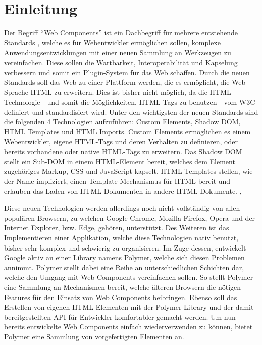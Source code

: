 \chapter{Einleitung}\label{einleitung}

Der Begriff ``Web Components'' ist ein Dachbegriff für mehrere entstehende Standards \cite{citeulike:13844988}, welche es für Webentwickler ermöglichen sollen, komplexe Anwendungsentwicklungen mit einer neuen Sammlung an Werkzeugen zu vereinfachen. Diese sollen die Wartbarkeit, Interoperabilität und Kapselung verbessern und somit ein Plugin-System für das Web schaffen. Durch die neuen Standards soll das Web zu einer Plattform werden, die es ermöglicht, die Web-Sprache \ac{HTML} zu erweitern. Dies ist bisher nicht möglich, da die \ac{HTML}-Technologie - und somit die Möglichkeiten, \ac{HTML}-Tags zu benutzen - vom \ac{W3C} definiert und standardisiert wird. Unter den wichtigsten der neuen Standards sind die folgenden 4 Technologien aufzuführen: Custom Elements, Shadow \ac{DOM}, \ac{HTML} Templates und \ac{HTML} Imports. Custom Elements ermöglichen es einem Webentwickler, eigene \ac{HTML}-Tags und deren Verhalten zu definieren, oder bereits vorhandene oder native \ac{HTML}-Tags zu erweitern. Das Shadow \ac{DOM} stellt ein Sub-\ac{DOM} in einem \ac{HTML}-Element bereit, welches dem Element zugehöriges Markup, \ac{CSS} und JavaScript kapselt. \ac{HTML} Templates stellen, wie der Name impliziert, einen Template-Mechanismus für \ac{HTML} bereit und erlauben das Laden von \ac{HTML}-Dokumenten in andere \ac{HTML}-Dokumente. \cite{citeulike:13842702}, \cite{citeulike:13842701}

Diese neuen Technologien werden allerdings noch nicht vollständig von allen populären Browsern, zu welchen Google Chrome, Mozilla Firefox, Opera und der Internet Explorer, bzw. Edge, gehören, unterstützt. Des Weiteren ist das Implementieren einer Applikation, welche diese Technologien nativ benutzt, bisher sehr komplex und schwierig zu organisieren. Im Zuge dessen, entwickelt Google aktiv an einer Library namens Polymer, welche sich diesen Problemen annimmt.
Polymer stellt dabei eine Reihe an unterschiedlichen Schichten dar, welche den Umgang mit Web Components vereinfachen sollen. So stellt Polymer eine Sammlung an Mechanismen bereit, welche älteren Browsern die nötigen Features für den Einsatz von Web Components beibringen. Ebenso soll das Erstellen von eigenen \ac{HTML}-Elementen mit der Polymer-Library und der damit bereitgestellten \ac{API} für Entwickler komfortabler gemacht werden. Um nun bereits entwickelte Web Components einfach wiederverwenden zu können, bietet Polymer eine Sammlung von vorgefertigten Elementen an.

